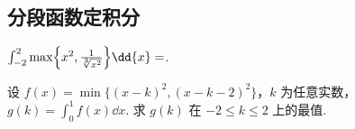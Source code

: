 \subsection{分段函数定积分}

	\begin{ti}
		$\int_{-2}^{2} \max\Bigl\{ x^{2}, \frac{1}{\sqrt[3]{x^{2}}} \Bigr\} \dd{x} = $.
	\end{ti}

	\begin{ti}
		设 $f(x) = \min\bigl\{ (x - k)^{2}, (x - k - 2)^{2} \bigr\}$，$k$ 为任意实数，$g(k) = \int_{0}^{1} f(x) \dd{x}$. 求 $g(k)$ 在 $-2 \leq k \leq 2$ 上的最值.
	\end{ti}